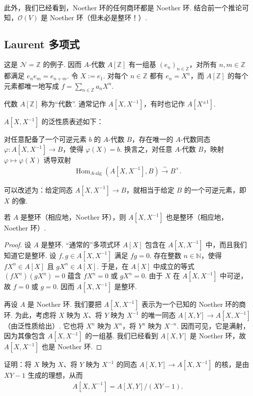 此外，我们已经看到，Noether 环的任何商环都是 Noether 环. 结合前一个推论可知，$\mathcal O(V)$ 是 Noether 环（但未必是整环！）.

\subsection{Laurent 多项式}\label{sec:galois-1-4-6}
这是 $\mathcal N=\mathbb Z$ 的例子. 因而 $A$-代数 $A[\mathbb Z]$ 有一组基 $(e_n)_{n\in\mathbb Z}$，对所有 $n,m\in\mathbb Z$ 都满足 $e_ne_m=e_{n+m}$. 令 $X:=e_1$. 对每个 $n\in\mathbb Z$ 都有 $e_n=X^n$，而 $A[\mathbb Z]$ 的每个元素都唯一地写成 $f=\sum_{n\in\mathbb Z}a_nX^n$.
\begin{definition*}
代数 $A[\mathbb Z]$ 称为``代数''. 通常记作 $A[X,X^{-1}]$，有时也记作 $A[X^{\pm1}]$.
\end{definition*}
$A[X,X^{-1}]$ 的泛性质表述如下：
\begin{proposition*}
对任意配备了一个可逆元素 $b$ 的 $A$-代数 $B$，存在唯一的 $A$-代数同态 $\varphi\colon A[X,X^{-1}]\longrightarrow B$，使得 $\varphi(X)=b$. 换言之，对任意 $A$-代数 $B$，映射 $\varphi\longmapsto\varphi(X)$ 诱导双射
\begin{align*}
\operatorname{Hom}_{A\text{-}\mathrm{alg}}(A[X,X^{-1}],B)\xrightarrow{\sim}B^\times.
\end{align*}
\end{proposition*}
可以改述为：给定同态 $A[X,X^{-1}]\longrightarrow B$，就相当于给定 $B$ 的一个可逆元素，即 $X$ 的像.
\begin{proposition*}
若 $A$ 是整环（相应地，Noether 环），则 $A[X,X^{-1}]$ 也是整环（相应地，Noether 环）.
\end{proposition*}
\begin{proof}
设 $A$ 是整环. ``通常的''多项式环 $A[X]$ 包含在 $A[X,X^{-1}]$ 中，而且我们知道它是整环. 设 $f,g\in A[X,X^{-1}]$ 满足 $fg=0$. 存在整数 $n\in\mathbb N$，使得 $fX^n\in A[X]$ 且 $gX^n\in A[X]$. 于是，在 $A[X]$ 中成立的等式 $(fX^n)(gX^n)=0$ 蕴含 $fX^n=0$ 或 $gX^n=0$. 由于 $X$ 在 $A[X,X^{-1}]$ 中可逆，故 $f=0$ 或 $g=0$. 因而 $A[X,X^{-1}]$ 是整环.

再设 $A$ 是 Noether 环. 我们要把 $A[X,X^{-1}]$ 表示为一个已知的 Noether 环的商环. 为此，考虑将 $X$ 映为 $X$、将 $Y$ 映为 $X^{-1}$ 的唯一同态 $A[X,Y]\longrightarrow A[X,X^{-1}]$（由泛性质给出）. 它也将 $X^n$ 映为 $X^n$，将 $Y^n$ 映为 $X^{-n}$. 因而可见，它是满射，因为其像包含 $A[X,X^{-1}]$ 的一组基. 我们已经看到 $A[X,Y]$ 是 Noether 环，故 $A[X,X^{-1}]$ 也是 Noether 环.
\end{proof}
\begin{exercise*}
证明：将 $X$ 映为 $X$、将 $Y$ 映为 $X^{-1}$ 的同态 $A[X,Y]\longrightarrow A[X,X^{-1}]$ 的核，是由 $XY-1$ 生成的理想，从而
\begin{align*}
A[X,X^{-1}]=A[X,Y]/(XY-1).
\end{align*}
\end{exercise*}

